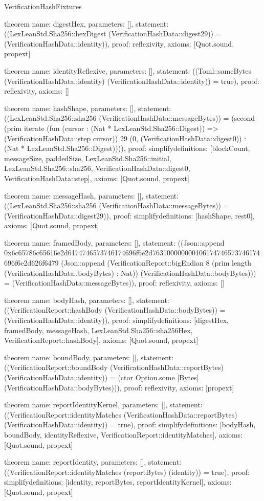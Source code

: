 \begin{lexlean}{VerificationHashFixtures}
\begin{semanticmodule}
theorem{
  name: digestHex,
  parameters: [],
  statement: ((LexLeanStd.Sha256::hexDigest (VerificationHashData::digest29)) = (VerificationHashData::identity)),
  proof: reflexivity{},
  axioms: [Quot.sound, propext]
}

theorem{
  name: identityReflexive,
  parameters: [],
  statement: ((Toml::sameBytes (VerificationHashData::identity) (VerificationHashData::identity)) = true),
  proof: reflexivity{},
  axioms: []
}

theorem{
  name: hashShape,
  parameters: [],
  statement: ((LexLeanStd.Sha256::sha256 (VerificationHashData::messageBytes)) = (second (prim iterate (fun (cursor : (Nat * LexLeanStd.Sha256::Digest)) => (VerificationHashData::step cursor)) 29 (0, (VerificationHashData::digest0)) : (Nat * LexLeanStd.Sha256::Digest)))),
  proof: simplify{definitions: [blockCount, messageSize, paddedSize, LexLeanStd.Sha256::initial, LexLeanStd.Sha256::sha256, VerificationHashData::digest0, VerificationHashData::step]},
  axioms: [Quot.sound, propext]
}

theorem{
  name: messageHash,
  parameters: [],
  statement: ((LexLeanStd.Sha256::sha256 (VerificationHashData::messageBytes)) = (VerificationHashData::digest29)),
  proof: simplify{definitions: [hashShape, rest0]},
  axioms: [Quot.sound, propext]
}

theorem{
  name: framedBody,
  parameters: [],
  statement: ((Json::append 0x6c65786c65616e2d6174746573746174696f6e2d763100000000106174746573746174696f6e2d626f6479 (Json::append (VerificationReport::bigEndian 8 (prim length (VerificationHashData::bodyBytes) : Nat)) (VerificationHashData::bodyBytes))) = (VerificationHashData::messageBytes)),
  proof: reflexivity{},
  axioms: []
}

theorem{
  name: bodyHash,
  parameters: [],
  statement: ((VerificationReport::hashBody (VerificationHashData::bodyBytes)) = (VerificationHashData::identity)),
  proof: simplify{definitions: [digestHex, framedBody, messageHash, LexLeanStd.Sha256::sha256Hex, VerificationReport::hashBody]},
  axioms: [Quot.sound, propext]
}

theorem{
  name: boundBody,
  parameters: [],
  statement: ((VerificationReport::boundBody (VerificationHashData::reportBytes) (VerificationHashData::identity)) = (ctor Option.some [Bytes] (VerificationHashData::bodyBytes))),
  proof: reflexivity{},
  axioms: [propext]
}

theorem{
  name: reportIdentityKernel,
  parameters: [],
  statement: ((VerificationReport::identityMatches (VerificationHashData::reportBytes) (VerificationHashData::identity)) = true),
  proof: simplify{definitions: [bodyHash, boundBody, identityReflexive, VerificationReport::identityMatches]},
  axioms: [Quot.sound, propext]
}

theorem{
  name: reportIdentity,
  parameters: [],
  statement: ((VerificationReport::identityMatches (reportBytes) (identity)) = true),
  proof: simplify{definitions: [identity, reportBytes, reportIdentityKernel]},
  axioms: [Quot.sound, propext]
}

\end{semanticmodule}
\end{lexlean}
